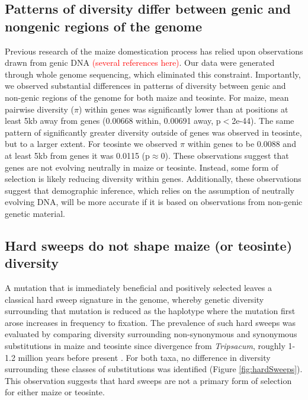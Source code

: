 \documentclass{pnastwo}
\begin{document}
\begin{article}
\subsection{Patterns of diversity differ between genic and
  nongenic regions of the genome}
Previous research of the maize domestication process has relied upon
observations drawn from genic DNA \textcolor{red}{(several references
  here)}. Our data were generated through whole genome sequencing,
which eliminated this constraint. Importantly, we observed substantial
differences in patterns of diversity between genic and non-genic regions
of the genome for both maize and teosinte. For maize, mean pairwise
diversity ($\pi$) within genes was significantly lower than at
positions at least 5kb away from genes (0.00668 within, 0.00691 away, p$<$2e-44). The same
pattern of significantly greater diversity outside of genes was observed in
teosinte, but to a larger extent. For teosinte we observed $\pi$
within genes to be 0.0088 and at least 5kb from genes it was 0.0115
(p$\approx$0). These observations suggest that genes are not evolving
neutrally in maize or teosinte. Instead, some form of selection is likely
reducing diversity within genes. Additionally, these observations
suggest that demographic inference, which relies on the assumption of
neutrally evolving DNA, will be more accurate if it is based on
observations from non-genic genetic material.

\subsection{Hard sweeps do not shape maize (or teosinte) diversity}
A mutation that is immediately beneficial and positively selected leaves a classical hard
sweep signature in the genome, whereby genetic diversity surrounding
that mutation is reduced as the haplotype where the mutation first
arose increases in frequency to fixation. The prevalence of such hard
sweeps was evaluated by comparing diversity
surrounding non-synonymous and synonymous substitutions in maize and
teosinte since divergence from \emph{Tripsacum}, roughly 1-1.2 million years before
present \cite{ross2009}. For both taxa, no difference in diversity
surrounding these classes of substitutions was identified (Figure
\ref{fig:hardSweeps}). This observation suggests that hard sweeps are not a primary form of
selection for either maize or teosinte.


\end{article}
\end{document}
